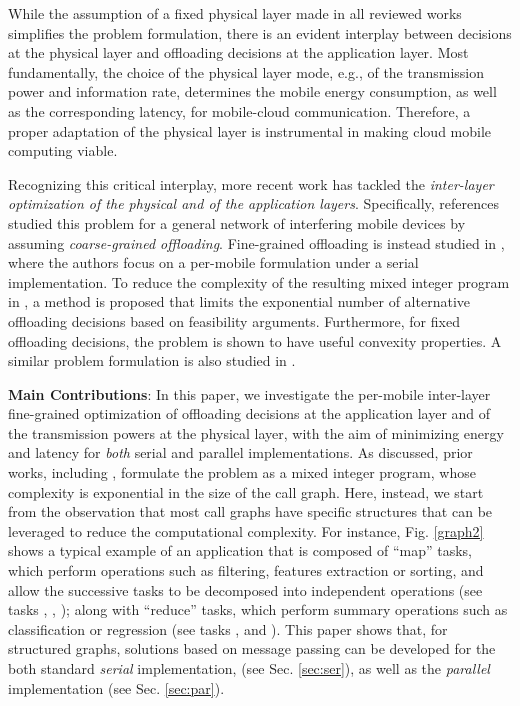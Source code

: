 \documentclass[journal,twocolumn,10pt,twoside]{IEEEtranTCOM}
\theoremstyle{plain}
\theoremstyle{plain}
\theoremstyle{remark}
\begin{document}
While the assumption of a fixed physical layer made in all reviewed works simplifies the problem
formulation, there is an evident interplay between decisions at the
physical layer and offloading decisions at the application layer.
Most fundamentally, the choice of the physical layer mode, e.g., of
the transmission power and information rate, determines
the mobile energy consumption, as well as the corresponding latency, for mobile-cloud communication. Therefore, a proper adaptation of the physical layer is instrumental in making cloud mobile computing viable.


Recognizing this critical interplay, more
recent work has tackled the \textit{inter-layer optimization of the physical
and of the application layers}. Specifically, references \cite{barba}\cite{stef}
 studied this problem for a general network of interfering
mobile devices by assuming \textit{coarse-grained offloading}. Fine-grained offloading is instead studied in \cite{bar}, where the authors focus on a per-mobile formulation under a serial implementation. To reduce the complexity of the resulting mixed integer program in \cite{bar}, a method is proposed that limits the exponential number of alternative offloading decisions based on feasibility arguments. Furthermore, for fixed offloading decisions, the problem is shown to have useful convexity properties. A similar problem formulation is also studied in \cite{holis}.


\textbf{Main Contributions}: In this paper, we investigate the per-mobile inter-layer fine-grained optimization of offloading decisions at the application layer and of the transmission powers at the physical layer, with the aim of minimizing energy and latency for \textit{both} serial and parallel implementations. As discussed, prior works, including \cite{bar}\cite{holis}, formulate the problem as a mixed integer program, whose complexity is exponential in the size of the call graph. Here, instead, we start from the observation that most call graphs have specific structures that can be leveraged to reduce the computational complexity. For instance, Fig. \ref{graph2} shows a typical example of an application that is composed of ``map'' tasks, which perform operations such as filtering, features extraction or sorting, and allow the successive tasks to be decomposed into independent operations (see tasks , , ); along with ``reduce'' tasks, which perform summary operations such as classification or regression (see tasks ,  and ). This paper shows that, for structured graphs, solutions based on message passing can be developed for the both standard \textit{serial} implementation, (see Sec. \ref{sec:ser}), as well as the \textit{parallel} implementation (see Sec. \ref{sec:par}).
\end{document}
